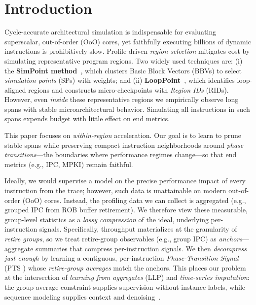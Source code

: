 \documentclass[conference]{IEEEtran}
\newcommand{\pts}{\textsc{PTS} }
\begin{document}
\maketitle

\section{Introduction}
\label{sec:intro}

Cycle-accurate architectural simulation is indispensable for evaluating superscalar, out-of-order (OoO) cores, yet faithfully executing billions of dynamic instructions is prohibitively slow. Profile-driven \emph{region selection} mitigates cost by simulating representative program regions. Two widely used techniques are: (i) the \textbf{SimPoint method}~\cite{simpoint-asplos02,simpoint03,simpoint-howto}, which clusters Basic Block Vectors (BBVs) to select \emph{simulation points} (SPs) with weights; and (ii) \textbf{LoopPoint}~\cite{looppoint-hpca22}, which identifies loop-aligned regions and constructs micro-checkpoints with \emph{Region IDs} (RIDs). However, even \emph{inside} these representative regions we empirically observe long spans with stable microarchitectural behavior. Simulating all instructions in such spans expends budget with little effect on end metrics.

This paper focuses on \emph{within-region} acceleration. Our  goal is to learn to prune stable spans while preserving compact instruction neighborhoods around \emph{phase transitions}—the boundaries where performance regimes change—so that end metrics (e.g., IPC, MPKI) remain faithful.

Ideally, we would supervise a model on the precise performance impact of every instruction from the trace; however, such data is unattainable on modern out-of-order (OoO) cores. Instead, the profiling data we can collect is aggregated (e.g., grouped IPC from ROB buffer retirement). We therefore view these measurable, group-level statistics as a \emph{lossy compression} of the ideal, underlying per-instruction signals. Specifically, throughput materializes at the granularity of \emph{retire groups}, so we treat retire-group observables (e.g., group IPC) as \emph{anchors}—aggregate summaries that compress per-instruction signals. We then \emph{decompress just enough} by learning a contiguous, per-instruction \emph{Phase-Transition Signal} (\pts) whose \emph{retire-group averages} match the anchors. This places our problem at the intersection of \emph{learning from aggregates} (LLP) and \emph{time-series imputation}: the group-average constraint supplies supervision without instance labels, while sequence modeling supplies context and denoising~\cite{yu2014-llp,scott2020-llp,law2018-agg,zhang2020-agg}.
\end{document}

